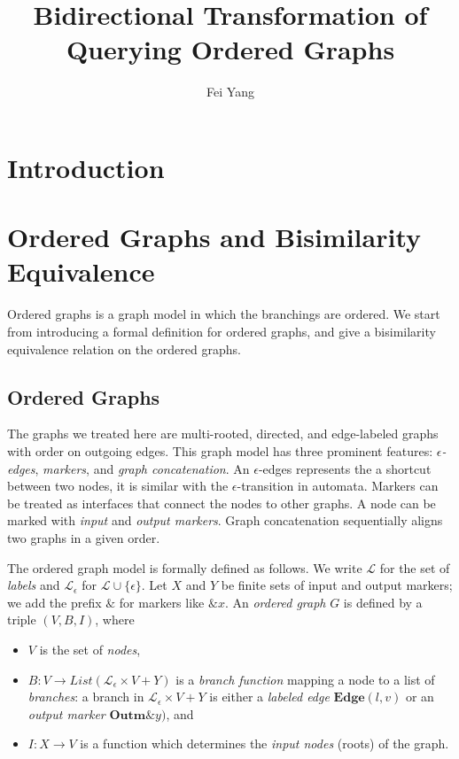 \documentclass{llncs}
\title{Bidirectional Transformation of Querying Ordered Graphs}
\author{Fei Yang}
\institute
{ BASICS\\
  Department of Computer Science and Engineering\\
  Shanghai Jiao Tong University, P.R.China\\
  \email{iamyf@sjtu.edu.cn}
}
\begin{document}
\maketitle

\section{Introduction}\label{sec-intro}

\section{Ordered Graphs and Bisimilarity Equivalence}\label{sec-order}

Ordered graphs is a graph model in which the branchings are ordered. We start from introducing a formal definition for ordered graphs, and give a bisimilarity equivalence relation on the ordered graphs.

\subsection{Ordered Graphs}

The graphs we treated here are multi-rooted, directed, and edge-labeled graphs with order on outgoing edges. This graph model has three prominent features: \emph{$\epsilon$-edges}, \emph{markers}, and \emph{graph concatenation}. An $\epsilon$-edges represents the a shortcut between two nodes, it is similar with the $\epsilon$-transition in automata. Markers can be treated as interfaces that connect the nodes to other graphs. A node can be marked with \emph{input} and \emph{output markers}. Graph concatenation sequentially aligns two graphs in a given order.

The ordered graph model is formally defined as follows. We write $\mathcal{L}$ for the set of \emph{labels} and $\mathcal{L}_{\epsilon}$ for $\mathcal{L}\cup\{\epsilon\}$. Let $X$ and $Y$ be finite sets of input and output markers; we add the prefix $\&$ for markers like $\& x$.
    An \emph{ordered graph} $G$ is defined by a triple $(V,B,I)$, where
    \begin{itemize}
        \item $V$ is the set of \emph{nodes},
        \item $B:V\rightarrow List(\mathcal{L}_{\epsilon}\times V+Y)$ is a \emph{branch function} mapping a node to a list of \emph{branches}: a branch in $\mathcal{L}_{\epsilon}\times V+Y$ is either a \emph{labeled edge} $\mathbf{Edge}(l,v)$ or an \emph{output marker} $\mathbf{Outm}\&y)$, and
        \item $I:X \rightarrow V$ is a function which determines the \emph{input nodes} (roots) of the graph.
    \end{itemize}
\end{document}
